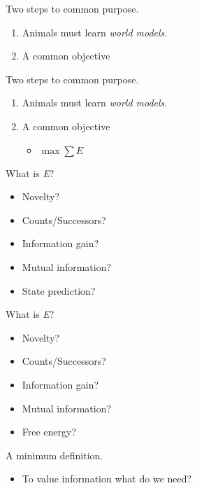\documentclass[10pt]{beamer}
\begin{document}
\begin{frame}[fragile]{Two steps to common purpose.}
\begin{enumerate}
    \item Animals must learn \textit{world models}.
    \item A common objective
\end{enumerate}
\end{frame}

\begin{frame}[fragile]{Two steps to common purpose.}
\begin{enumerate}
    \item Animals must learn \textit{world models}.
    \item A common objective
    \begin{itemize}
        \item $ \max \sum E$
    \end{itemize}
\end{enumerate}
\end{frame}

\begin{frame}[fragile]{What is \textit{E}?}
\begin{itemize}
    \item Novelty?
    \item Counts/Successors?
    \item Information gain?
    \item Mutual information? 
    \item State prediction?
\end{itemize}
\end{frame}

\begin{frame}[fragile]{What is \textit{E}?}
\begin{itemize}
    \item Novelty?
    \item Counts/Successors?
    \item Information gain?
    \item Mutual information?
    \item \alert{Free energy?}
\end{itemize}
\end{frame}

\begin{frame}[fragile]{A minimum definition.}
\begin{itemize}
    \item To value information what do we need?
\end{itemize}
\end{frame}
\end{document}

